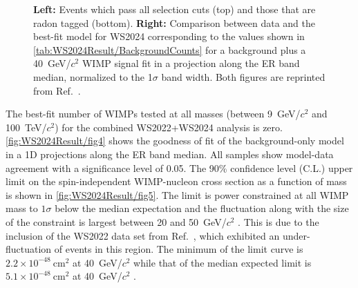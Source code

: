 \begin{figure}[!ht]
	\caption[The final set of events passing all selection cuts with the panels distinguishing all events in WS2024 from those that are radon tagged. Alongside the comparison between data and best-fit model for WS2024 model is shown.]{\textbf{Left:} Events which pass all selection cuts (top) and those that are radon tagged (bottom). \textbf{Right:} Comparison between data and the best-fit model for WS2024 corresponding to the values shown in \autoref{tab:WS2024Result/BackgroundCounts} for a background plus a 40~GeV/$c^2$ WIMP signal fit in a projection along the ER band median, normalized to the 1$\sigma$ band width. Both figures are reprinted from Ref.~\cite{LZCollaboration:2024lux}.}
	\label{fig:WS2024Result/fig3_fig4}
\end{figure}

The best-fit number of WIMPs tested at all masses (between 9~GeV/$c^2$ and 100~TeV/$c^2$) for the combined WS2022+WS2024 analysis is zero. \autoref{fig:WS2024Result/fig4} shows the goodness of fit of the background-only model in a 1D projections along the ER band median. All samples show model-data agreement with a significance level of 0.05. The 90\% confidence level (C.L.) upper limit on the spin-independent WIMP-nucleon cross section as a function of mass is shown in \autoref{fig:WS2024Result/fig5}. The limit is power constrained at all WIMP mass to $1\sigma$ below the median expectation and the fluctuation along with the size of the constraint is largest between 20 and 50~GeV/$c^2$ \cite{LZCollaboration:2024lux}. This is due to the inclusion of the WS2022 data set from Ref.~\cite{LZ:2022lsv}, which exhibited an under-fluctuation of events in this region. The minimum of the limit curve is $2.2\times10^{-48}~\text{cm}^2$ at 40~GeV/$c^2$ while that of the median expected limit is $5.1\times10^{-48}~\text{cm}^2$ at 40~GeV/$c^2$ \cite{LZCollaboration:2024lux}.

